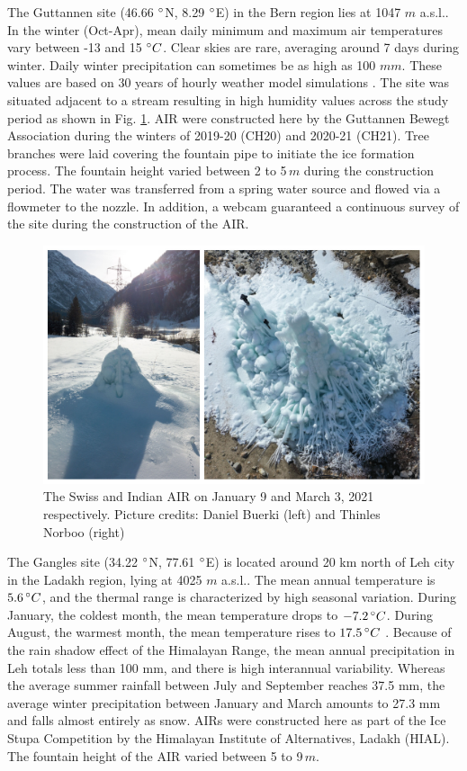 \documentclass[utf8]{frontiersSCNS}
\begin{document}
The Guttannen site (46.66 $\degree$N, 8.29 $\degree$E) in the Bern region lies at 1047 $m$ a.s.l.. In the winter
(Oct-Apr), mean daily minimum and maximum air temperatures vary between -13 and 15 $\degree C$. Clear skies are
rare, averaging around 7 days during winter. Daily winter precipitation can sometimes be as high as 100 $mm$.
These values are based on 30 years of hourly weather model simulations \citep{guttannen}. The site was situated
adjacent to a stream resulting in high humidity values across the study period as shown in Fig. \ref{fig:2AIR}.
AIR were constructed here by the Guttannen Bewegt Association during the winters of 2019-20 (CH20) and 2020-21
(CH21). Tree branches were laid covering the fountain pipe to initiate the ice formation process. The fountain
height varied between 2 to 5\,$m$ during the construction period. The water was transferred from a spring water
source and flowed via a flowmeter to the nozzle. In addition, a webcam guaranteed a continuous survey of the
site during the construction of the AIR.

\begin{figure}
	\begin{center}
		\includegraphics[width=12 cm]{Figures/Figure_2.jpg}
	\end{center}
	\caption{The Swiss and Indian AIR on January 9 and March 3, 2021 respectively. Picture credits: Daniel Buerki (left)
		and Thinles Norboo (right)}
	\label{fig:2AIR}
\end{figure}

The Gangles site (34.22 $\degree$N, 77.61 $\degree$E) is located around 20 km north of Leh city in the Ladakh
region, lying at 4025 $m$ a.s.l.. The mean annual temperature is $5.6 \, \degree C$, and the thermal range is
characterized by high seasonal variation. During January, the coldest month, the mean temperature drops to $-7.2
\, \degree C$. During August, the warmest month, the mean temperature rises to $17.5 \, \degree C$
\citep{Nusser_2012}. Because of the rain shadow effect of the Himalayan Range, the mean annual precipitation in Leh
totals less than 100 mm, and there is high interannual variability. Whereas the average summer rainfall between
July and September reaches 37.5 mm, the average winter precipitation between January and March amounts to 27.3
mm and falls almost entirely as snow.  AIRs were constructed here as part of the Ice Stupa Competition by the
Himalayan Institute of Alternatives, Ladakh (HIAL). The fountain height of the AIR varied between 5 to 9\,$m$.
\end{document}
